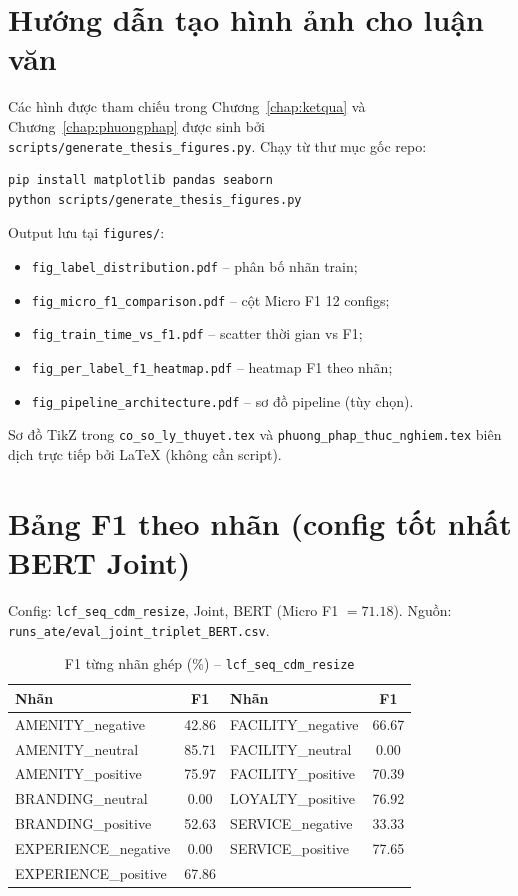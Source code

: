 \chapter{Hướng dẫn tạo hình ảnh cho luận văn}
\label{app:figures}

Các hình được tham chiếu trong Chương~\ref{chap:ketqua} và Chương~\ref{chap:phuongphap}
được sinh bởi \texttt{scripts/generate\_thesis\_figures.py}. Chạy từ thư mục gốc repo:

\begin{lstlisting}[language=bash]
pip install matplotlib pandas seaborn
python scripts/generate_thesis_figures.py
\end{lstlisting}

Output lưu tại \texttt{figures/}:

\begin{itemize}
  \item \texttt{fig\_label\_distribution.pdf} -- phân bố nhãn train;
  \item \texttt{fig\_micro\_f1\_comparison.pdf} -- cột Micro F1 12 configs;
  \item \texttt{fig\_train\_time\_vs\_f1.pdf} -- scatter thời gian vs F1;
  \item \texttt{fig\_per\_label\_f1\_heatmap.pdf} -- heatmap F1 theo nhãn;
  \item \texttt{fig\_pipeline\_architecture.pdf} -- sơ đồ pipeline (tùy chọn).
\end{itemize}

Sơ đồ TikZ trong \texttt{co\_so\_ly\_thuyet.tex} và \texttt{phuong\_phap\_thuc\_nghiem.tex}
biên dịch trực tiếp bởi \LaTeX{} (không cần script).

\chapter{Bảng F1 theo nhãn (config tốt nhất BERT Joint)}
\label{app:perlabel}

Config: \texttt{lcf\_seq\_cdm\_resize}, Joint, BERT (Micro F1 $=71.18$).
Nguồn: \texttt{runs\_ate/eval\_joint\_triplet\_BERT.csv}.

\begin{table}[H]
\centering
\caption{F1 từng nhãn ghép (\%) -- \texttt{lcf\_seq\_cdm\_resize}}
\label{tab:app_perlabel}
\small
\begin{tabular}{@{}lc|lc@{}}
\toprule
\textbf{Nhãn} & \textbf{F1} & \textbf{Nhãn} & \textbf{F1} \\
\midrule
AMENITY\_negative & 42.86 & FACILITY\_negative & 66.67 \\
AMENITY\_neutral  & 85.71 & FACILITY\_neutral  & 0.00 \\
AMENITY\_positive & 75.97 & FACILITY\_positive & 70.39 \\
BRANDING\_neutral & 0.00  & LOYALTY\_positive  & 76.92 \\
BRANDING\_positive& 52.63 & SERVICE\_negative  & 33.33 \\
EXPERIENCE\_negative & 0.00 & SERVICE\_positive & 77.65 \\
EXPERIENCE\_positive & 67.86 & & \\
\bottomrule
\end{tabular}
\end{table}


